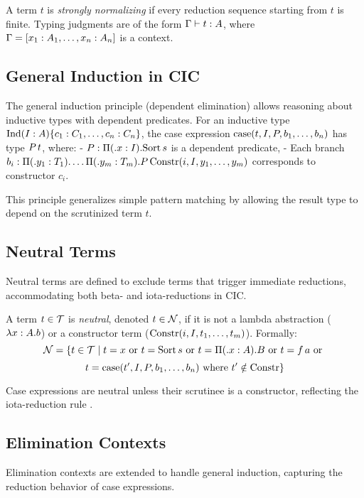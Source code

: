 \documentclass{article}
\begin{document}
A term \(t\) is \emph{strongly normalizing} if every reduction sequence
starting from \(t\) is finite. Typing judgments are of the
form \(\Gamma \vdash t : A\), where \(\Gamma = [x_1 : A_1, \dots, x_n : A_n]\) is a context.

\subsection{General Induction in CIC}
The general induction principle (dependent elimination) allows reasoning
about inductive types with dependent predicates. For an inductive
type \(\text{Ind}(I : A)\{c_1 : C_1, \dots, c_n : C_n\}\), the case
expression \(\text{case}(t, I, P, b_1, \dots, b_n)\) has type \(P \, t\), where:
- \(P : \Pi ( . x : I). \text{Sort} \, s\) is a dependent predicate,
- Each branch \(b_i : \Pi ( . y_1 : T_1). \dots \Pi ( . y_m : T_m).
  P \, \text{Constr}(i, I, y_1, \dots, y_m)\) corresponds to constructor \(c_i\).

This principle generalizes simple pattern matching by allowing the
result type to depend on the scrutinized term \(t\).

\subsection{Neutral Terms}
Neutral terms are defined to exclude terms that trigger immediate
reductions, accommodating both beta- and iota-reductions in CIC.

\begin{definition}
A term \(t \in \mathcal{T}\) is \emph{neutral}, denoted \(t \in \mathcal{N}\),
if it is not a lambda abstraction (\(\lambda x : A . b\)) or a constructor
term (\(\text{Constr}(i, I, t_1, \dots, t_m)\)). Formally:
\[
\mathcal{N} = \{ t \in \mathcal{T} \mid t = x \text{ or } t = \text{Sort} \,
  s \text{ or } t = \Pi ( . x : A). B \text{ or } t = f \, a \text{ or }
\]
\[
    t = \text{case}(t', I, P, b_1, \dots, b_n) \text{ where } t' \notin \text{Constr} \}
\]

\end{definition}

Case expressions are neutral unless their scrutinee is a constructor,
reflecting the iota-reduction rule \cite{riba2008}.

\subsection{Elimination Contexts}
Elimination contexts are extended to handle general induction,
capturing the reduction behavior of case expressions.
\end{document}
